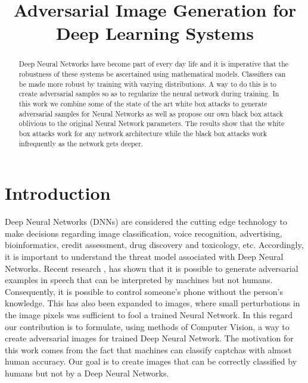 \documentclass[12pt, conference, letterpaper]{IEEEtran}
\begin{document}
\title{Adversarial Image Generation for Deep Learning Systems}


\author{
}







\maketitle
\begin{abstract}
Deep Neural Networks have become part of every day life and it is imperative that the robustness of these systems be ascertained using mathematical models. 
Classifiers can be made more robust by training with varying distributions. A way to do this is to create adversarial samples so as to regularize the neural network during training. In this work we combine some of the state of the art white box attacks to generate adversarial samples for Neural Networks as well as propose our own black box attack oblivious to the original Neural Network parameters. The results show that the white box attacks work for any network architecture while the black box attacks work infrequently as the network gets deeper.
\end{abstract}


\IEEEpeerreviewmaketitle



\section{Introduction}
Deep Neural Networks (DNNs) are considered the cutting edge technology to make decisions regarding image classification, voice recognition, advertising, bioinformatics, credit assessment, drug discovery and toxicology, etc. Accordingly, it is important to understand the threat model associated with Deep Neural Networks. Recent research \cite{1}, \cite{2} has shown that it is possible to generate adversarial examples in speech that can be interpreted by machines but not humans. Consequently, it is possible to control someone’s phone without the person's knowledge.\cite{8} This has also been expanded to images\cite{3}, where small perturbations in the image pixels was sufficient to fool a trained Neural Network. 
In this regard our contribution is to formulate, using methods of Computer Vision, a way to create adversarial images for trained Deep Neural Network. The motivation for this work comes from the fact that machines can classify captchas with almost human accuracy. Our goal is to create images that can be correctly classified by humans but not by a Deep Neural Networks. \newline
\end{document}
